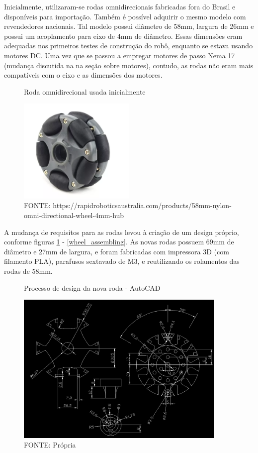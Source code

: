 Inicialmente, utilizaram-se rodas omnidirecionais fabricadas fora do Brasil e disponíveis para importação. Também é
possível adquirir o mesmo modelo com revendedores nacionais.
Tal modelo possui diâmetro de 58mm, largura de 26mm e possui um acoplamento para eixo de 4mm de diâmetro. Essas
dimensões eram adequadas nos primeiros testes de construção do robô, enquanto se estava usando motores DC. Uma vez que
se passou a empregar motores de passo Nema 17 (mudança discutida na na seção sobre motores), contudo, as rodas não eram
mais compatíveis com o eixo e as dimensões dos motores.

\begin{figure}[h]
	\centering
	\caption{Roda omnidirecional usada inicialmente}
	\includegraphics[width=0.5\textwidth]{figures/roda_china.png}
    \caption*{FONTE: https://rapidroboticsaustralia.com/products/58mm-nylon-omni-directional-wheel-4mm-hub}
\end{figure}

A mudança de requisitos para as rodas levou à criação de um design próprio, conforme figuras \ref{new_wheel_cad_design}
- \ref{wheel_assembling}. As novas rodas possuem 69mm de diâmetro e 27mm de largura, e foram fabricadas com impressora
3D (com filamento PLA), parafusos sextavado de M3, e reutilizando os rolamentos das rodas de 58mm.

\begin{figure}[h]
	\centering
	\caption{Processo de design da nova roda - AutoCAD}
	\label{new_wheel_cad_design}
	\includegraphics[width=0.9\textwidth]{figures/roda_processo_desing_passo1}
    \caption*{FONTE: Própria}
\end{figure}

